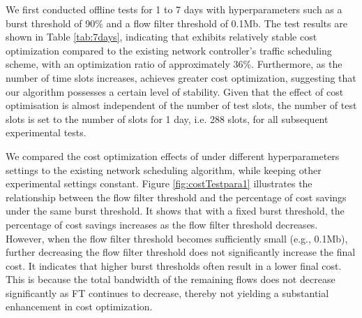 We first conducted offline tests for 1 to 7 days with hyperparameters such as a burst threshold of 90\% and a flow filter threshold of 0.1Mb. The test results are shown in Table \ref{tab:7days}, indicating that {\sys} exhibits relatively stable cost optimization compared to the existing network controller's traffic scheduling scheme, with an optimization ratio of approximately 36\%. Furthermore, as the number of time slots increases, {\sys} achieves greater cost optimization, suggesting that our algorithm possesses a certain level of stability. Given that the effect of cost optimisation is almost independent of the number of test slots, the number of test slots is set to the number of slots for 1 day, i.e. 288 slots, for all subsequent experimental tests.

\begin{table}[tbp]
	\centering
        \vspace{-0.1in}
	\caption{\small Cost optimization for 1 to 7 days of offline testing under a 90\% burst threshold and a 0.1Mb flow filter threshold}
	\label{tab:7days}
\end{table}

We compared the cost optimization effects of {\sys} under different hyperparameters settings to the existing network scheduling algorithm, while keeping other experimental settings constant. Figure \ref{fig:costTestpara1} illustrates the relationship between the flow filter threshold and the percentage of cost savings under the same burst threshold. It shows that with a fixed burst threshold, the percentage of cost savings increases as the flow filter threshold decreases. However, when the flow filter threshold becomes sufficiently small (e.g., 0.1Mb), further decreasing the flow filter threshold does not significantly increase the final cost. It indicates that higher burst thresholds often result in a lower final cost. This is because the total bandwidth of the remaining flows does not decrease significantly as FT continues to decrease, thereby not yielding a substantial enhancement in cost optimization.

